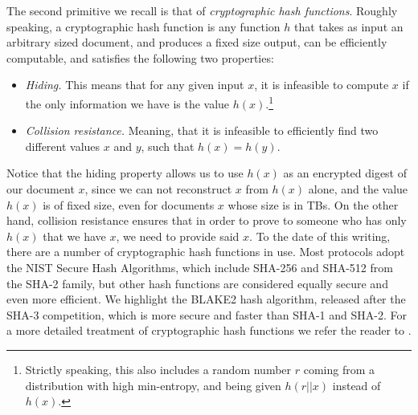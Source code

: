 The second primitive we recall is that of {\em cryptographic hash functions}. Roughly speaking, a cryptographic hash function is any function $h$ that takes as input an arbitrary sized document, and produces a fixed size output, can be efficiently computable, and satisfies the following two properties:
\begin{itemize}
\item {\em Hiding.} This means that for any given input $x$, it is infeasible to compute $x$ if the only information we have is the value $h(x)$.\footnote{Strictly speaking, this also includes a random number $r$ coming from a distribution with high min-entropy, and being given $h(r||x)$ instead of $h(x)$.}
\item {\em Collision resistance.} Meaning, that it is infeasible to efficiently find two different values $x$ and $y$, such that $h(x)=h(y)$.
\end{itemize}
Notice that the hiding property allows us to use $h(x)$ as an encrypted digest of our document $x$, since we can not reconstruct $x$ from $h(x)$ alone, and the value $h(x)$ is of fixed size, even for documents $x$ whose size is in TBs. On the other hand, collision resistance ensures that in order to prove to someone who has only $h(x)$ that we have $x$, we need to provide said $x$. To the date of this writing, there are a number of cryptographic hash functions in use. Most protocols adopt the NIST Secure Hash Algorithms\cite{sha_standard}, which include SHA-256 and SHA-512 from the SHA-2 family, but other hash functions are considered equally secure and even more efficient. We highlight the BLAKE2 hash algorithm, released after the SHA-3 competition, which is more secure and faster than SHA-1 and SHA-2. For a more detailed treatment of cryptographic hash functions we refer the reader to \cite{sha_standard,aumasson,sha3zoo,bitcoinbook}. 

\medskip
{}


